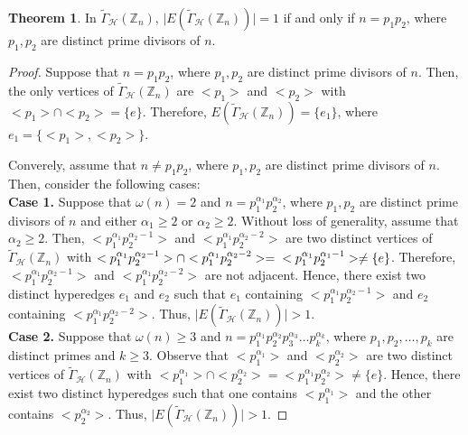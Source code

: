 \documentclass[11pt,a4paper]{article}
\theoremstyle{definition}
\newtheorem{theorem}{Theorem}[section]
\theoremstyle{remark}
\begin{document}
	\begin{theorem}\label{singleedgeset}
		 In $\tilde{\Gamma}_\mathcal{H}(\mathbb{Z}_n)$, $\mid E(\tilde{\Gamma}_\mathcal{H}(\mathbb{Z}_n))\mid = 1$ if and only if $n=p_1p_2$, where $p_1,p_2$ are distinct prime divisors of $n$.
			\end{theorem}
		\begin{proof}
			Suppose that $n=p_1p_2$, where $p_1,p_2$ are distinct prime divisors of $n$. Then, the only vertices of $\tilde{\Gamma}_\mathcal{H}(\mathbb{Z}_n)$ are $<p_1>$ and $<p_2>$ with $<p_1> \cap <p_2>=\{e\}$. Therefore, $E(\tilde{\Gamma}_\mathcal{H}(\mathbb{Z}_n))=\{e_1\}$, where $e_1 = \{<p_1>,<p_2>\}$.
			
			Converely, assume that $n \neq p_1p_2$, where $p_1,p_2$ are distinct prime divisors of $n$. Then, consider the following cases:\\
			\textbf{Case 1.} Suppose that $\omega(n)=2$ and $n=p_1^{\alpha_1}p_2^{\alpha_2}$, where $p_1,p_2$ are distinct prime divisors of $n$ and either $\alpha_1 \geq 2$ or  $\alpha_2 \geq 2$. Without loss of generality, assume that $\alpha_2 \geq 2$. Then, $<p_1^{\alpha_1}p_2^{\alpha_2 -1}>$ and $<p_1^{\alpha_1}p_2^{\alpha_2 -2}>$ are two distinct vertices of $\tilde{\Gamma}_\mathcal{H}(\mathbb{Z}_n)$ with $<p_1^{\alpha_1}p_2^{\alpha_2 -1}> \cap <p_1^{\alpha_1}p_2^{\alpha_2 -2}> =\\ <p_1^{\alpha_1}p_2^{\alpha_1-1}> \neq \{e\}$. Therefore, $<p_1^{\alpha_1}p_2^{\alpha_2 -1}>$ and $<p_1^{\alpha_1}p_2^{\alpha_2 -2}>$ are not adjacent. Hence, there exist two distinct hyperedges $e_1$ and $e_2$ such that $e_1$ containing $<p_1^{\alpha_1}p_2^{\alpha_2 -1}>$ and $e_2$ containing $<p_1^{\alpha_1}p_2^{\alpha_2 -2}>$. Thus,  $\mid E(\tilde{\Gamma}_\mathcal{H}(\mathbb{Z}_n))\mid > 1$.\\
			\textbf{Case 2.}   Suppose that $\omega(n) \geq 3$ and   $n=p_1^{\alpha_1}p_2^{\alpha_2}p_3^{\alpha_3}\ldots p_k^{\alpha_k}$, where $p_1,p_2, \ldots, p_k$ are distinct primes and $k\geq 3$. Observe that $<p_1^{\alpha_1}>$ and $<p_2^{\alpha_2}>$ are two distinct vertices of $\tilde{\Gamma}_\mathcal{H}(\mathbb{Z}_n)$ with $<p_1^{\alpha_1}> \cap  <p_2^{\alpha_2}> = <p_1^{\alpha_1}p_2^{\alpha_2}> \neq \{e\}$. Hence, there exist two distinct hyperedges  such that one contains $<p_1^{\alpha_1}>$ and the other contains $<p_2^{\alpha_2}>$. Thus,  $\mid E(\tilde{\Gamma}_\mathcal{H}(\mathbb{Z}_n))\mid > 1$.
		\end{proof}
\end{document}
